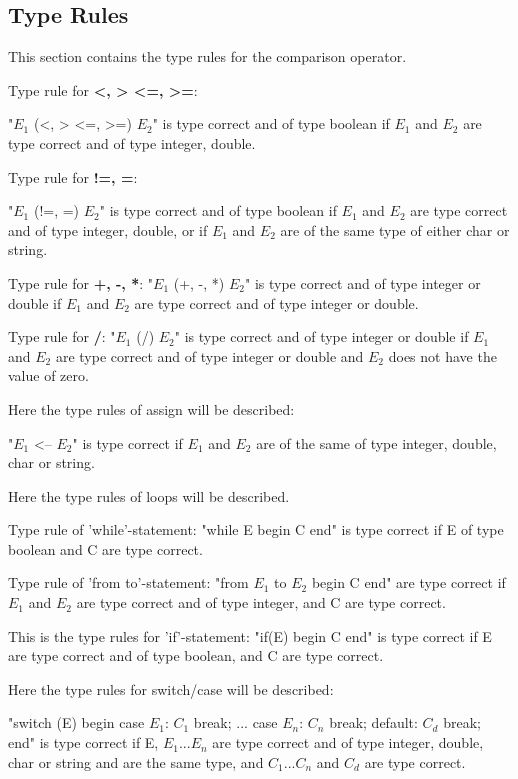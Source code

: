 \subsection{Type Rules}
This section contains the type rules for the comparison operator.

Type rule for \textbf{<, > <=, >=}:

"$E_1$ (<, > <=, >=) $E_2$" is type correct and of type boolean if $E_1$ and $E_2$ are type correct and of type integer, double.

Type rule for \textbf{!=, =}:

"$E_1$ (!=, =) $E_2$" is type correct and of type boolean if $E_1$ and $E_2$ are type correct and of type integer, double, or if $E_1$ and $E_2$ are of the same type of either char or string.

Type rule for \textbf{+, -, *}:
"$E_1$ (+, -, *) $E_2$" is type correct and of type integer or double if $E_1$ and $E_2$ are type correct and of type integer or double.

Type rule for \textbf{/}:
"$E_1$ (/) $E_2$" is type correct and of type integer or double if $E_1$ and $E_2$ are type correct and of type integer or double and $E_2$ does not have the value of zero.

Here the type rules of assign will be described:

"$E_1$ <-- $E_2$" is type correct if $E_1$ and $E_2$ are of the same of type integer, double, char or string.

Here the type rules of loops will be described.

Type rule of 'while'-statement: 
"while E begin C end" is type correct if E of type boolean and C are type correct.

Type rule of 'from to'-statement: 
"from $E_1$ to $E_2$ begin C end" are type correct if $E_1$ and $E_2$ are type correct and of type integer, and C are type correct.

This is the type rules for 'if'-statement:
"if(E) begin C end" is type correct if E are type correct and of type boolean, and C are type correct.

Here the type rules for switch/case will be described:

"switch (E) begin case $E_1$: $C_1$ break; ... case $E_n$: $C_n$ break; default: $C_d$ break; end" is type correct if E, $E_1$...$E_n$ are type correct and of type integer, double, char or string and are the same type, and $C_1$...$C_n$ and $C_d$ are type correct.